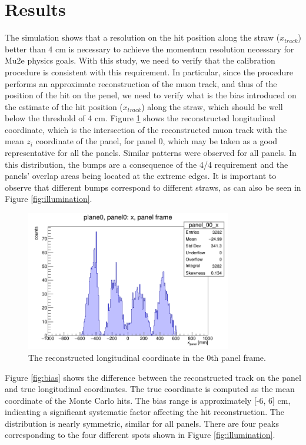 \section{Results}
The simulation shows that a resolution on the 
hit position along the straw ($x_{track}$) 
better than 4 cm is necessary to achieve the 
momentum resolution necessary for Mu2e physics goals.
With this study, we need to verify that the 
calibration procedure is consistent with 
this requirement. In particular, since the 
procedure performs an approximate reconstruction 
of the muon track, and thus of the position 
of the hit on the penel, we need to verify 
what is the bias introduced on the estimate 
of the hit position ($x_{track}$) along the straw, 
which should be well below the threshold of 4 cm. 
Figure \ref{fig:recx} shows the reconstructed 
longitudinal coordinate, which is the intersection 
of the reconstructed muon track with the mean $z_i$ 
coordinate of the panel, for panel 0, which may 
be taken as a good representative for all the panels.
Similar patterns were observed for all 
panels. In this distribution, the bumps 
are a consequence of the 4/4 
requirement and the panels' overlap areas 
being located at the extreme edges. 
It is important to observe that 
different bumps correspond to different 
straws, as can also be seen in Figure 
\ref{fig:illumination}.
\begin{figure}[!h]
    \centering
    \includegraphics[width=0.8\textwidth]{figures/png/x_panel0.png}
    \caption[The reconstructed longitudinal coordinate in the 0th panel frame.]{The reconstructed longitudinal coordinate in the 0th panel frame.}
    \label{fig:recx}
\end{figure}
Figure \ref{fig:bias} shows the difference   
between the reconstructed track on the panel 
and true longitudinal coordinates. 
The true coordinate is computed as the mean coordinate 
of the Monte Carlo hits. 
The bias range is approximately [-6, 6] cm, 
indicating a significant systematic factor 
affecting the hit reconstruction. The 
distribution is nearly symmetric, similar 
for all panels. 
There are four peaks corresponding to the 
four different spots shown in Figure 
\ref{fig:illumination}.

